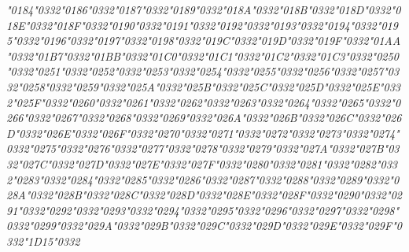 \documentclass[landscape]{article}
\newcommand{\gs}{\hspace{0.5mm}}	%
\begin{document}
{\itshape
	\char"0184\char"0332\gs \char"0186\char"0332\gs \char"0187\char"0332\gs \char"0189\char"0332\gs \char"018A\char"0332\gs \char"018B\char"0332\gs \char"018D\char"0332\gs \char"018E\char"0332\gs \char"018F\char"0332\gs \char"0190\char"0332\gs \char"0191\char"0332\gs \char"0192\char"0332\gs \char"0193\char"0332\gs \char"0194\char"0332\gs \char"0195\char"0332\gs \char"0196\char"0332\gs \char"0197\char"0332\gs \char"0198\char"0332\gs \char"019C\char"0332\gs \char"019D\char"0332\gs \char"019F\char"0332\gs \char"01AA\char"0332\gs \char"01B7\char"0332\gs \char"01BB\char"0332\gs \char"01C0\char"0332\gs \char"01C1\char"0332\gs \char"01C2\char"0332\gs \char"01C3\char"0332\gs \char"0250\char"0332\gs \char"0251\char"0332\gs \char"0252\char"0332\gs \char"0253\char"0332\gs \char"0254\char"0332\gs \char"0255\char"0332\gs \char"0256\char"0332\gs \char"0257\char"0332\gs \char"0258\char"0332\gs \char"0259\char"0332\gs \char"025A\char"0332\gs \char"025B\char"0332\gs \char"025C\char"0332\gs \char"025D\char"0332\gs \char"025E\char"0332\gs \char"025F\char"0332\gs \char"0260\char"0332\gs \char"0261\char"0332\gs \char"0262\char"0332\gs \char"0263\char"0332\gs \char"0264\char"0332\gs \char"0265\char"0332\gs \char"0266\char"0332\gs \char"0267\char"0332\gs \char"0268\char"0332\gs \char"0269\char"0332\gs \char"026A\char"0332\gs \char"026B\char"0332\gs \char"026C\char"0332\gs \char"026D\char"0332\gs \char"026E\char"0332\gs \char"026F\char"0332\gs \char"0270\char"0332\gs \char"0271\char"0332\gs \char"0272\char"0332\gs \char"0273\char"0332\gs \char"0274\char"0332\gs \char"0275\char"0332\gs \char"0276\char"0332\gs \char"0277\char"0332\gs \char"0278\char"0332\gs \char"0279\char"0332\gs \char"027A\char"0332\gs \char"027B\char"0332\gs \char"027C\char"0332\gs \char"027D\char"0332\gs \char"027E\char"0332\gs \char"027F\char"0332\gs \char"0280\char"0332\gs \char"0281\char"0332\gs \char"0282\char"0332\gs \char"0283\char"0332\gs \char"0284\char"0332\gs \char"0285\char"0332\gs \char"0286\char"0332\gs \char"0287\char"0332\gs \char"0288\char"0332\gs \char"0289\char"0332\gs \char"028A\char"0332\gs \char"028B\char"0332\gs \char"028C\char"0332\gs \char"028D\char"0332\gs \char"028E\char"0332\gs \char"028F\char"0332\gs \char"0290\char"0332\gs \char"0291\char"0332\gs \char"0292\char"0332\gs \char"0293\char"0332\gs \char"0294\char"0332\gs \char"0295\char"0332\gs \char"0296\char"0332\gs \char"0297\char"0332\gs \char"0298\char"0332\gs \char"0299\char"0332\gs \char"029A\char"0332\gs \char"029B\char"0332\gs \char"029C\char"0332\gs \char"029D\char"0332\gs \char"029E\char"0332\gs \char"029F\char"0332\gs \char"1D15\char"0332	
}
\end{document}
